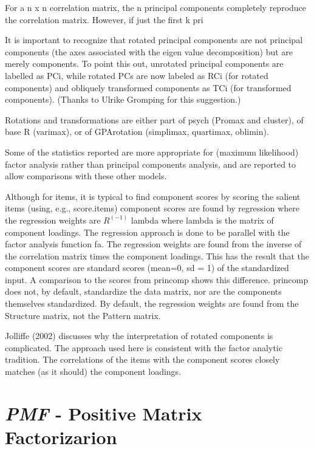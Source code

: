 For a n x n correlation matrix, the n principal components completely reproduce the correlation matrix. However, if just the first k pri

It is important to recognize that rotated principal components are not principal components (the axes associated with the eigen value decomposition) but are merely components. To point this out, unrotated principal components are labelled as PCi, while rotated PCs are now labeled as RCi (for rotated components) and obliquely transformed components as TCi (for transformed components). (Thanks to Ulrike Gromping for this suggestion.)

Rotations and transformations are either part of psych (Promax and cluster), of base R (varimax), or of GPArotation (simplimax, quartimax, oblimin).

Some of the statistics reported are more appropriate for (maximum likelihood) factor analysis rather than principal components analysis, and are reported to allow comparisons with these other models.

Although for items, it is typical to find component scores by scoring the salient items (using, e.g., score.items) component scores are found by regression where the regression weights are $R^(-1)$ lambda where lambda is the matrix of component loadings. The regression approach is done to be parallel with the factor analysis function fa. The regression weights are found from the inverse of the correlation matrix times the component loadings. This has the result that the component scores are standard scores (mean=0, sd = 1) of the standardized input. A comparison to the scores from princomp shows this difference. princomp does not, by default, standardize the data matrix, nor are the components themselves standardized. By default, the regression weights are found from the Structure matrix, not the Pattern matrix.

Jolliffe (2002) discusses why the interpretation of rotated components is complicated. The approach used here is consistent with the factor analytic tradition. The correlations of the items with the component scores closely matches (as it should) the component loadings. 





\section{\textit{PMF} - Positive Matrix Factorizarion}

